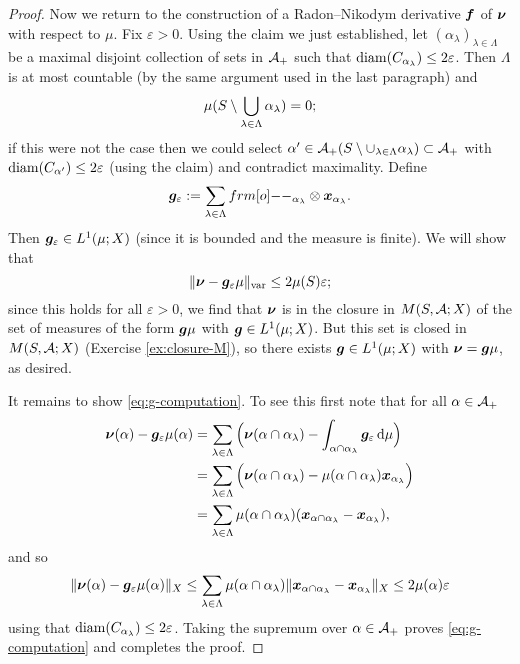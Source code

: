 \begin{proof}
  Now we return to the construction of a Radon--Nikodym derivative $\bm{f}$ of $\bm{\nu}$ with respect to $\mu$.
  Fix $\varepsilon > 0$.
  Using the claim we just established, let $(\alpha_{\lambda})_{\lambda \in \Lambda}$ be a maximal disjoint collection of sets in $\mathcal{A}_+$ such that $\operatorname{diam}(C_{\alpha_{\lambda}}) \leq 2\varepsilon$.
  Then $\Lambda$ is at most countable (by the same argument used in the last paragraph) and
  \begin{equation*}
    \mu(S \setminus \bigcup_{\lambda \in \Lambda} \alpha_{\lambda}) = 0;
  \end{equation*}
  if this were not the case then we could select $\alpha' \in \mathcal{A}_+(S \setminus \cup_{\lambda \in \Lambda} \alpha_{\lambda}) \subset \mathcal{A}_+$ with $\operatorname{diam}(C_{\alpha'}) \leq 2\varepsilon$ (using the claim) and contradict maximality.
  Define
  \begin{equation*}
    \mb{g}_{\varepsilon} := \sum_{\lambda \in \Lambda} \1_{\alpha_{\lambda}} \otimes \mb{x}_{\alpha_{\lambda}}.
  \end{equation*}
  Then $\bm{g}_{\varepsilon} \in L^1(\mu;X)$ (since it is bounded and the measure is finite).
  We will show that
  \begin{equation}\label{eq:g-computation}
    \|\bm{\nu} - \bm{g}_{\varepsilon}\mu\|_{\mathrm{var}} \leq 2\mu(S)\varepsilon;
  \end{equation}
  since this holds for all $\varepsilon > 0$, we find that $\bm{\nu}$ is in the closure in $M(S,\mathcal{A};X)$ of the set of measures of the form $\bm{g}\mu$ with $\bm{g} \in L^1(\mu;X)$.
  But this set is closed in $M(S,\mathcal{A};X)$ (Exercise \ref{ex:closure-M}), so there exists $\bm{g} \in L^1(\mu;X)$ with $\bm{\nu} = \bm{g}\mu$, as desired.

  It remains to show \eqref{eq:g-computation}.
  To see this first note that for all $\alpha \in \mathcal{A}_+$
  \begin{equation*}
    \begin{aligned}
      \bm{\nu}(\alpha) - \bm{g}_\varepsilon\mu(\alpha)
      &= \sum_{\lambda \in \Lambda} \Big(  \bm{\nu}(\alpha \cap \alpha_{\lambda}) - \int_{\alpha \cap \alpha_{\lambda}} \bm{g}_{\varepsilon} \, \mathrm{d}\mu \Big) \\
      &= \sum_{\lambda \in \Lambda} \Big(  \bm{\nu}(\alpha \cap \alpha_{\lambda}) - \mu(\alpha \cap \alpha_{\lambda}) \bm{x}_{\alpha_{\lambda}} \Big) \\
      &= \sum_{\lambda \in \Lambda} \mu(\alpha \cap \alpha_{\lambda})(\bm{x}_{\alpha \cap \alpha_{\lambda}} - \bm{x}_{\alpha_{\lambda}}),
    \end{aligned}
  \end{equation*}
  and so
  \begin{equation*}
    \|\bm{\nu}(\alpha) - \bm{g}_\varepsilon\mu(\alpha)\|_{X}
    \leq \sum_{\lambda \in \Lambda} \mu(\alpha \cap \alpha_{\lambda}) \|\bm{x}_{\alpha \cap \alpha_{\lambda}} - \bm{x}_{\alpha_{\lambda}}\|_{X} \leq 2\mu(\alpha)\varepsilon
  \end{equation*}
  using that $\operatorname{diam}(C_{\alpha_{\lambda}}) \leq 2\varepsilon$.
  Taking the supremum over $\alpha \in \mathcal{A}_{+}$ proves \eqref{eq:g-computation} and completes the proof.
\end{proof}

